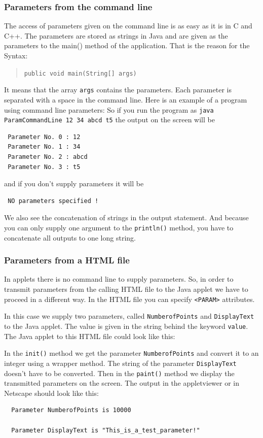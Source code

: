 \subsubsection{Parameters from the command line}
The access of parameters given on the command line is as easy as it
is in C and C++. The parameters are stored as strings in Java and
are given as the parameters to the main() method of the application.
That is the reason for the Syntax:
\begin{quotation}
  \verb|public void main(String[] args) |
\end{quotation}
It means that the array \verb|args| contains the parameters. Each parameter
is separated with a space in the command line. Here is an example of a 
program using command line parameters:
So if you run the program as \verb|java ParamCommandLine 12 34 abcd t5|
the output on the screen will be
\begin{verbatim}
 Parameter No. 0 : 12
 Parameter No. 1 : 34
 Parameter No. 2 : abcd
 Parameter No. 3 : t5
\end{verbatim}
and if you don't supply parameters it will be
\begin{verbatim}
 NO parameters specified !
\end{verbatim}
We also see the concatenation of strings in the output statement.
And because you can only supply one argument to the  \verb|println()|
method, you have to concatenate all outputs to one long string.

\subsubsection{Parameters from a HTML file}
In applets there is no command line to supply parameters. 
So, in order to transmit 
parameters from the calling HTML file to the Java applet we have to
proceed in a different way.
In the HTML file you can
specify \verb|<PARAM>| attributes.

In this case we supply two parameters, called \verb|NumberofPoints| and
\verb|DisplayText| to the Java applet. The value is given in the string
behind the keyword \verb|value|. The Java applet to this HTML file
could look like this:

In the \verb|init()| method we get the parameter \verb|NumberofPoints|
and convert it to an integer using a wrapper method. The string 
of the parameter \verb|DisplayText| doesn't have
to be converted. Then in the \verb|paint()| method we display
the transmitted parameters on the screen. The output in the 
appletviewer or in Netscape should look like this:
\begin{verbatim}
  Parameter NumberofPoints is 10000

  Parameter DisplayText is "This_is_a_test_parameter!"
\end{verbatim}



